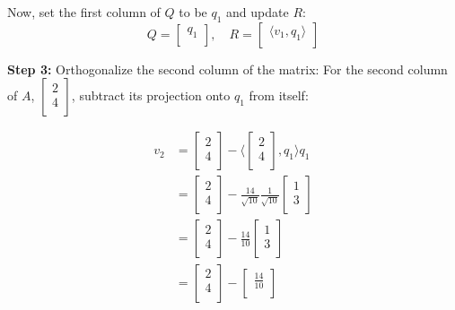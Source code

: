 \documentclass{article}
\begin{document}
\begin{enumerate}[leftmargin=\labelsep]
Now, set the first column of $Q$ to be $q_1$ and update $R$:
\[
Q = \begin{bmatrix}
q_1 \\
\end{bmatrix}, \quad R = \begin{bmatrix}
\langle v_1, q_1 \rangle \\
\end{bmatrix}
\]

\textbf{Step 3:} Orthogonalize the second column of the matrix:
For the second column of $A$, $\begin{bmatrix}
2 \\
4 \\
\end{bmatrix}$, subtract its projection onto $q_1$ from itself:

\begin{align*}
v_2 &= \begin{bmatrix}
2 \\
4 \\
\end{bmatrix} - \langle \begin{bmatrix}
2 \\
4 \\
\end{bmatrix}, q_1 \rangle q_1 \\
&= \begin{bmatrix}
2 \\
4 \\
\end{bmatrix} - \frac{14}{\sqrt{10}} \frac{1}{\sqrt{10}} \begin{bmatrix}
1 \\
3 \\
\end{bmatrix} \\
&= \begin{bmatrix}
2 \\
4 \\
\end{bmatrix} - \frac{14}{10} \begin{bmatrix}
1 \\
3 \\
\end{bmatrix} \\
&= \begin{bmatrix}
2 \\
4 \\
\end{bmatrix} - \begin{bmatrix}
\frac{14}{10} \\

\end{bmatrix}
\end{align*}
\end{enumerate}
\end{document}
